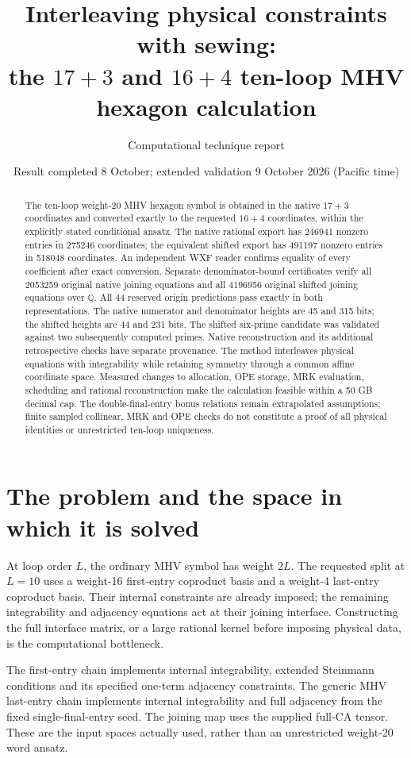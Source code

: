 \documentclass[11pt]{article}
\title{Interleaving physical constraints with sewing:\\the $17+3$ and $16+4$ ten-loop MHV hexagon calculation}
\author{Computational technique report}
\date{Result completed 8 October; extended validation 9 October 2026 (Pacific time)}
\begin{document}
\maketitle
\begin{abstract}
The ten-loop weight-20 MHV hexagon symbol is obtained in the native
$17+3$ coordinates and converted exactly to the requested $16+4$
coordinates, within the explicitly stated conditional ansatz.
The native rational export has 246941 nonzero entries in 275246
coordinates; the equivalent shifted export has 491197 nonzero entries
in 518048 coordinates. An independent WXF reader confirms equality of
every coefficient after exact conversion. Separate denominator-bound
certificates verify all 2053259 original native joining equations and
all 4196956 original shifted joining equations over $\mathbb Q$.
All 44 reserved origin predictions pass exactly in both representations.
The native numerator and denominator heights are 45 and 315 bits; the
shifted heights are 44 and 231 bits. The shifted six-prime candidate was
validated against two subsequently computed primes. Native reconstruction
and its additional retrospective checks have separate provenance.
The method interleaves physical equations with integrability while retaining
symmetry through a common affine coordinate space. Measured changes to
allocation, OPE storage, MRK evaluation, scheduling and rational
reconstruction make the calculation feasible within a 50 GB decimal cap.
The double-final-entry bonus relations remain extrapolated assumptions;
finite sampled collinear, MRK and OPE checks do not constitute a proof of
all physical identities or unrestricted ten-loop uniqueness.
\end{abstract}

\section{The problem and the space in which it is solved}
At loop order $L$, the ordinary MHV symbol has weight $2L$. The requested
split at $L=10$ uses a weight-16 first-entry coproduct basis and a weight-4
last-entry coproduct basis. Their internal constraints are already imposed;
the remaining integrability and adjacency equations act at their joining
interface. Constructing the full interface matrix, or a large rational
kernel before imposing physical data, is the computational bottleneck.

The first-entry chain implements internal integrability, extended Steinmann
conditions and its specified one-term adjacency constraints. The generic MHV
last-entry chain implements internal integrability and full adjacency from
the fixed single-final-entry seed. The joining map uses the supplied full-CA
tensor. These are the input spaces actually used, rather than an unrestricted
weight-20 word ansatz.
\end{document}
